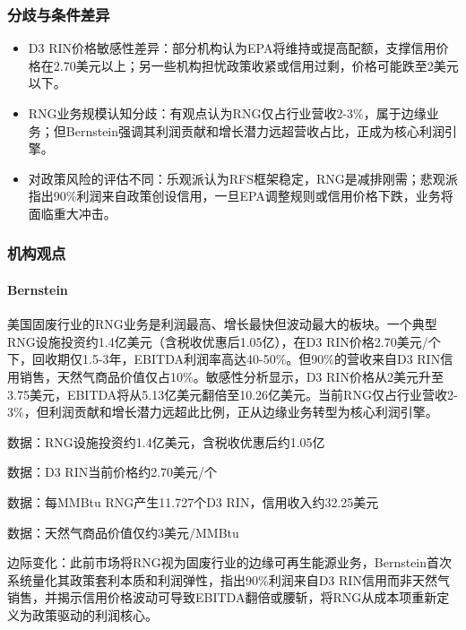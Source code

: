 \documentclass[11pt]{ctexart}
\begin{document}
\subsubsection*{分歧与条件差异}
\begin{itemize}
  \item D3 RIN价格敏感性差异：部分机构认为EPA将维持或提高配额，支撑信用价格在2.70美元以上；另一些机构担忧政策收紧或信用过剩，价格可能跌至2美元以下。
  \item RNG业务规模认知分歧：有观点认为RNG仅占行业营收2-3\%，属于边缘业务；但Bernstein强调其利润贡献和增长潜力远超营收占比，正成为核心利润引擎。
  \item 对政策风险的评估不同：乐观派认为RFS框架稳定，RNG是减排刚需；悲观派指出90\%利润来自政策创设信用，一旦EPA调整规则或信用价格下跌，业务将面临重大冲击。
\end{itemize}
\subsubsection*{机构观点}
\paragraph{Bernstein} 美国固废行业的RNG业务是利润最高、增长最快但波动最大的板块。一个典型RNG设施投资约1.4亿美元（含税收优惠后1.05亿），在D3 RIN价格2.70美元/个下，回收期仅1.5-3年，EBITDA利润率高达40-50\%。但90\%的营收来自D3 RIN信用销售，天然气商品价值仅占10\%。敏感性分析显示，D3 RIN价格从2美元升至3.75美元，EBITDA将从5.13亿美元翻倍至10.26亿美元。当前RNG仅占行业营收2-3\%，但利润贡献和增长潜力远超此比例，正从边缘业务转型为核心利润引擎。
{\small\color{refgray}数据：RNG设施投资约1.4亿美元，含税收优惠后约1.05亿\par}
{\small\color{refgray}数据：D3 RIN当前价格约2.70美元/个\par}
{\small\color{refgray}数据：每MMBtu RNG产生11.727个D3 RIN，信用收入约32.25美元\par}
{\small\color{refgray}数据：天然气商品价值仅约3美元/MMBtu\par}
{\small\color{refgray}边际变化：此前市场将RNG视为固废行业的边缘可再生能源业务，Bernstein首次系统量化其政策套利本质和利润弹性，指出90\%利润来自D3 RIN信用而非天然气销售，并揭示信用价格波动可导致EBITDA翻倍或腰斩，将RNG从成本项重新定义为政策驱动的利润核心。\par}
\end{document}
